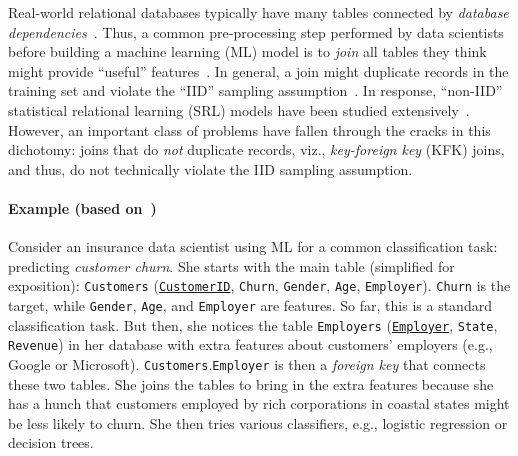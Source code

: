 \documentclass[sigconf]{acmart}
\begin{document}
Real-world relational databases typically have many tables connected by \textit{database dependencies}~\cite{cowbook}. Thus, a common pre-processing step 
performed by data scientists before building a machine learning (ML) model is to \textit{join} all tables they think might provide 
``useful'' features~\cite{crossmine,orion,rendle,hamlet,olteanuf}.
In general, a join might duplicate records in the training set and violate the ``IID'' sampling assumption~\cite{hastie}. 
In response, ``non-IID'' statistical relational learning (SRL) models have been studied extensively~\cite{srlbook}. 
However, an important class of problems have fallen through the cracks in this dichotomy: 
joins that do \textit{not} duplicate records, viz., \textit{key-foreign key} (KFK) joins, and thus, do not technically violate the IID sampling assumption.

\paragraph*{Example (based on~\cite{orion})}
Consider an insurance data scientist using ML for a common classification task: predicting \textit{customer churn}. She starts with the main table (simplified 
for exposition): \texttt{Customers} (\underline{\texttt{CustomerID}}, \texttt{Churn}, \texttt{Gender}, \texttt{Age}, \texttt{Employer}). 
\texttt{Churn} is the target, while \texttt{Gender}, \texttt{Age}, and \texttt{Employer} are features. So far, this is a standard classification task.  
But then, she notices the table \texttt{Employers} (\underline{\texttt{Employer}}, \texttt{State}, \texttt{Revenue}) in her database with extra features about 
customers' employers (e.g., Google or Microsoft). \texttt{Customers}.\texttt{Employer} is then a \textit{foreign key} that connects these two tables. 
She joins the tables to bring in the extra features because she has a hunch that customers employed by rich corporations in coastal states might be less likely 
to churn. She then tries various classifiers, e.g., logistic regression or decision trees.
\end{document}
